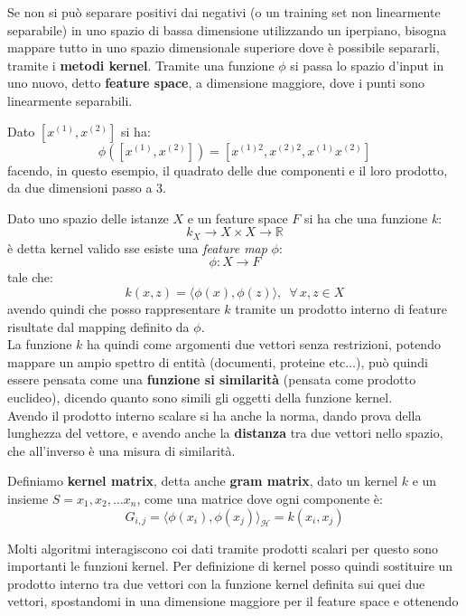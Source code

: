 Se non si può separare positivi dai negativi (o un training set non linearmente
separabile) in uno spazio di bassa dimensione
utilizzando un iperpiano, bisogna mappare tutto in uno spazio dimensionale
superiore dove è possibile separarli, tramite i \textbf{metodi kernel}. Tramite
una funzione $\phi$ si passa lo spazio d'input in uno nuovo, detto
\textbf{feature space}, a dimensione maggiore, dove i punti sono linearmente
separabili.  
\begin{esempio}
  Dato $[x^{(1)}, x^{(2)}]$ si ha:
  \[\phi([x^{(1)}, x^{(2)}])=[x^{(1)2}, x^{(2)2}, x^{(1)}x^{(2)}]\]
  facendo, in questo esempio, il quadrato delle due componenti e il loro
  prodotto, da due dimensioni passo a 3.
\end{esempio}
\begin{definizione}
  Dato uno spazio delle istanze $X$ e un feature space $F$ si ha che una
  funzione $k$:
  \[k_X\to X\times X\to\mathbb{R}\]
  è detta kernel valido sse esiste una \textit{feature map} $\phi$:
  \[\phi:X\to F\]
  tale che:
  \[k(x, z)=\langle\phi(x),\phi(z)\rangle,\,\,\,\forall\, x, z\in X\]
  avendo quindi che posso rappresentare $k$ tramite un prodotto interno di
  feature risultate dal mapping definito da $\phi$.\\
  La funzione $k$ ha quindi come argomenti due vettori senza restrizioni,
  potendo mappare un ampio spettro di entità (documenti, proteine etc$\ldots$),
  può quindi essere pensata come una \textbf{funzione si similarità} (pensata
  come prodotto euclideo), dicendo
  quanto sono simili gli oggetti della funzione kernel.\\
  Avendo il prodotto interno scalare si ha anche la norma, dando prova della
  lunghezza del vettore, e avendo anche la \textbf{distanza} tra due vettori
  nello spazio, che all'inverso è una misura di similarità.
\end{definizione}
\begin{definizione}
  Definiamo \textbf{kernel matrix}, detta anche \textbf{gram matrix}, dato un
  kernel $k$ e un insieme 
  $S=x_1, x_2,\ldots x_n$, come una matrice dove ogni componente è:
  \[G_{i, j}=\langle\phi(x_i),\phi(x_j)\rangle_{\mathcal{H}}=k(x_i, x_j)\]
\end{definizione}
Molti algoritmi interagiscono coi dati tramite prodotti scalari per questo sono
importanti le funzioni kernel. Per definizione di kernel posso quindi sostituire
un prodotto interno tra due vettori con la funzione kernel definita sui quei due
vettori, spostandomi in una dimensione maggiore per il feature space e ottenendo
